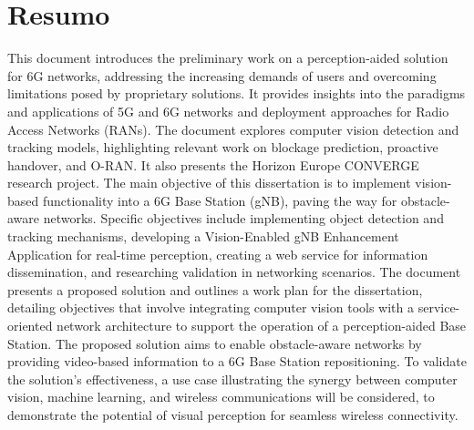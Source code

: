 \chapter*{Resumo}
This document introduces the preliminary work on a perception-aided solution for 6G networks, addressing the increasing demands of users and overcoming limitations posed by proprietary solutions. It provides insights into the paradigms and applications of 5G and 6G networks and deployment approaches for Radio Access Networks (RANs). The document explores computer vision detection and tracking models, highlighting relevant work on blockage prediction, proactive handover, and O-RAN. It also presents the Horizon Europe CONVERGE research project. The main objective of this dissertation is to implement vision-based functionality into a 6G Base Station (gNB), paving the way for obstacle-aware networks. Specific objectives include implementing object detection and tracking mechanisms, developing a Vision-Enabled gNB Enhancement Application for real-time perception, creating a web service for information dissemination, and researching validation in networking scenarios. The document presents a proposed solution and outlines a work plan for the dissertation, detailing objectives that involve integrating computer vision tools with a service-oriented network architecture to support the operation of a perception-aided Base Station. The proposed solution aims to enable obstacle-aware networks by providing video-based information to a 6G Base Station repositioning. To validate the solution's effectiveness, a use case illustrating the synergy between computer vision, machine learning, and wireless communications will be considered, to demonstrate the potential of visual perception for seamless wireless connectivity.
